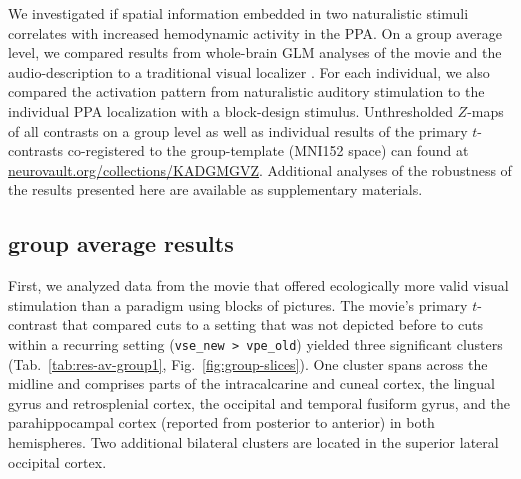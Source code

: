 \documentclass[english]{article}
\begin{document}

We investigated if spatial information embedded in two naturalistic stimuli
correlates with increased hemodynamic activity in the PPA.
On a group average level, we compared results from whole-brain GLM analyses of
the movie and the audio-description to a traditional visual localizer
\citep{sengupta2016extension}.
For each individual, we also compared the activation pattern from naturalistic
auditory stimulation to the individual PPA localization with a block-design
stimulus.
Unthresholded $Z$-maps of all contrasts on a group level as well as individual
results of the primary $t$-contrasts co-registered to the group-template (MNI152
space) can found at
\href{https://neurovault.org/collections/KADGMGVZ/}{\url{neurovault.org/collections/KADGMGVZ}}.
Additional analyses of the robustness of the results presented here are
available as supplementary materials.


\subsection{group average results}


First, we analyzed data from the movie that offered ecologically more valid
visual stimulation than a paradigm using blocks of pictures.
The movie's primary $t$-contrast that compared cuts to a setting that was not
depicted before to cuts within a recurring setting (\texttt{vse\_new >
vpe\_old}) yielded three significant clusters (Tab.~\ref{tab:res-av-group1},
Fig.~\ref{fig:group-slices}).
One cluster spans across the midline and comprises parts of the intracalcarine
and cuneal cortex, the lingual gyrus and retrosplenial cortex, the occipital and
temporal fusiform gyrus, and the parahippocampal cortex (reported from posterior
to anterior) in both hemispheres.
Two additional bilateral clusters are located in the superior lateral occipital
cortex.
\end{document}
